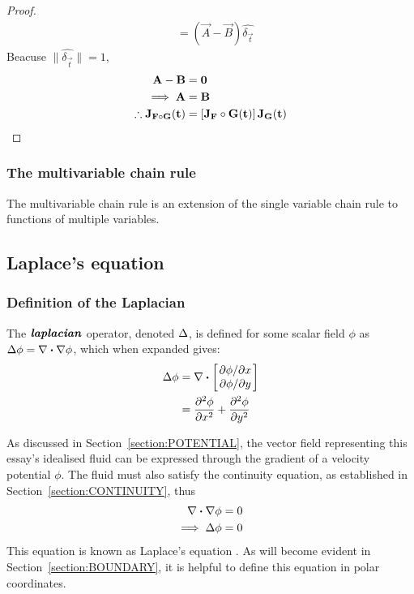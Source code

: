 \begin{lemma}
\begin{proof}
\begin{align*}
            &=\left(\vec{A}-\vec{B}\right)\hat{\delta_\vec{t}}
        \end{align*}
        Beacuse $\lVert\hat{\delta_\vec{t}}\rVert=1$,
        \begin{align*}
            \mathbf{A}-\mathbf{B}&=\mathbf{0}\\
            \implies\mathbf{A}&=\mathbf{B}\\
            \therefore\mathbf{J}_{\mathbf{F}\circ\mathbf{G}}(\mathbf{t})&=\left[\mathbf{J}_{\mathbf{F}}\circ\mathbf{G}(\mathbf{t})\right]\mathbf{J}_{\mathbf{G}}(\mathbf{t})
        \end{align*}
    \end{proof}
\end{lemma} 

\subsubsection{The multivariable chain rule}\label{section:MVCR}
The multivariable chain rule is an extension of the single variable chain rule to functions of multiple variables.

\subsection{Laplace's equation}
\subsubsection{Definition of the Laplacian}
\begin{defn}
    The $\textbf{\textit{laplacian}}$ operator, denoted $\Delta$, is defined for some scalar field $\phi$ as $\laplacian\phi=\divergence{\gradient{\phi}}$, which
    when expanded gives:
    \begin{align*}
        \laplacian\phi&=\divergence{\begin{bmatrix}
            \pdv*{\phi}{x}\\
            \pdv*{\phi}{y}
        \end{bmatrix}}\\
        &=\pdv[2]{\phi}{x}+\pdv[2]{\phi}{y}
    \end{align*}
\end{defn}
As discussed in Section~\ref{section:POTENTIAL}, the vector field representing this essay's idealised fluid can be expressed through the gradient of a velocity potential
$\phi$. The fluid must also satisfy the continuity equation, as established in Section~\ref{section:CONTINUITY}, thus
\begin{align*}
    \divergence{\nabla\phi}&=0\\
    \implies\laplacian\phi&=0
\end{align*}
This equation is known as Laplace's equation \cite{LEWIS2022131}. As will become evident in Section~\ref{section:BOUNDARY}, it is helpful to define this equation in polar coordinates.

